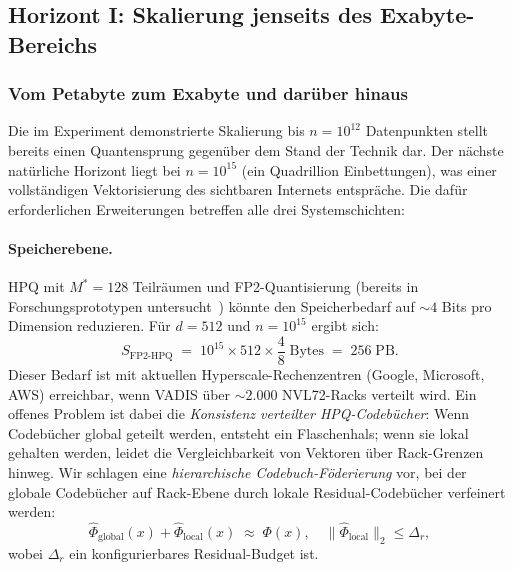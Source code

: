 ﻿\documentclass[12pt,a4paper]{article}
\begin{document}
\subsection{Horizont I: Skalierung jenseits des Exabyte-Bereichs}
\label{sub:horizont1}

\subsubsection{Vom Petabyte zum Exabyte und darüber hinaus}

Die im Experiment demonstrierte Skalierung bis $n = 10^{12}$
Datenpunkten stellt bereits einen Quantensprung gegenüber dem
Stand der Technik dar. Der nächste natürliche Horizont liegt
bei $n = 10^{15}$ (ein Quadrillion Einbettungen), was einer
vollständigen Vektorisierung des sichtbaren Internets entspräche.
Die dafür erforderlichen Erweiterungen betreffen alle drei
Systemschichten:

\paragraph{Speicherebene.}
HPQ mit $M^* = 128$ Teilräumen und FP2-Quantisierung
(bereits in Forschungsprototypen untersucht~\cite{frantar2022gptq})
könnte den Speicherbedarf auf $\sim 4$ Bits pro Dimension
reduzieren. Für $d = 512$ und $n = 10^{15}$ ergibt sich:
\[
  S_{\text{FP2-HPQ}} \;=\; 10^{15} \times 512 \times \frac{4}{8} \;\text{Bytes}
  \;=\; 256\;\text{PB}.
\]
Dieser Bedarf ist mit aktuellen Hyperscale-Rechenzentren
(Google, Microsoft, AWS) erreichbar, wenn VADIS über
$\sim 2.000$ NVL72-Racks verteilt wird. Ein offenes Problem
ist dabei die \emph{Konsistenz verteilter HPQ-Codebücher}:
Wenn Codebücher global geteilt werden, entsteht ein
Flaschenhals; wenn sie lokal gehalten werden, leidet die
Vergleichbarkeit von Vektoren über Rack-Grenzen hinweg.
Wir schlagen eine \emph{hierarchische Codebuch-Föderierung}
vor, bei der globale Codebücher auf Rack-Ebene durch
lokale Residual-Codebücher verfeinert werden:
\begin{equation}
  \hat{\Phi}_{\text{global}}(x) + \hat{\Phi}_{\text{local}}(x)
  \;\approx\; \Phi(x),
  \quad \|\hat{\Phi}_{\text{local}}\|_2 \leq \Delta_r,
  \label{eq:hierarchical_cb}
\end{equation}
wobei $\Delta_r$ ein konfigurierbares Residual-Budget ist.
\end{document}
